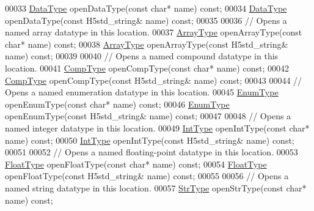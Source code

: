\begin{DoxyCode}
00033         \hyperlink{class_h5_1_1_data_type}{DataType} openDataType(\textcolor{keyword}{const} \textcolor{keywordtype}{char}* name) \textcolor{keyword}{const};
00034         \hyperlink{class_h5_1_1_data_type}{DataType} openDataType(\textcolor{keyword}{const} H5std\_string& name) \textcolor{keyword}{const};
00035 
00036         \textcolor{comment}{// Opens a named array datatype in this location.}
00037         \hyperlink{class_h5_1_1_array_type}{ArrayType} openArrayType(\textcolor{keyword}{const} \textcolor{keywordtype}{char}* name) \textcolor{keyword}{const};
00038         \hyperlink{class_h5_1_1_array_type}{ArrayType} openArrayType(\textcolor{keyword}{const} H5std\_string& name) \textcolor{keyword}{const};
00039 
00040         \textcolor{comment}{// Opens a named compound datatype in this location.}
00041         \hyperlink{class_h5_1_1_comp_type}{CompType} openCompType(\textcolor{keyword}{const} \textcolor{keywordtype}{char}* name) \textcolor{keyword}{const};
00042         \hyperlink{class_h5_1_1_comp_type}{CompType} openCompType(\textcolor{keyword}{const} H5std\_string& name) \textcolor{keyword}{const};
00043 
00044         \textcolor{comment}{// Opens a named enumeration datatype in this location.}
00045         \hyperlink{class_h5_1_1_enum_type}{EnumType} openEnumType(\textcolor{keyword}{const} \textcolor{keywordtype}{char}* name) \textcolor{keyword}{const};
00046         \hyperlink{class_h5_1_1_enum_type}{EnumType} openEnumType(\textcolor{keyword}{const} H5std\_string& name) \textcolor{keyword}{const};
00047 
00048         \textcolor{comment}{// Opens a named integer datatype in this location.}
00049         \hyperlink{class_h5_1_1_int_type}{IntType} openIntType(\textcolor{keyword}{const} \textcolor{keywordtype}{char}* name) \textcolor{keyword}{const};
00050         \hyperlink{class_h5_1_1_int_type}{IntType} openIntType(\textcolor{keyword}{const} H5std\_string& name) \textcolor{keyword}{const};
00051 
00052         \textcolor{comment}{// Opens a named floating-point datatype in this location.}
00053         \hyperlink{class_h5_1_1_float_type}{FloatType} openFloatType(\textcolor{keyword}{const} \textcolor{keywordtype}{char}* name) \textcolor{keyword}{const};
00054         \hyperlink{class_h5_1_1_float_type}{FloatType} openFloatType(\textcolor{keyword}{const} H5std\_string& name) \textcolor{keyword}{const};
00055 
00056         \textcolor{comment}{// Opens a named string datatype in this location.}
00057         \hyperlink{class_h5_1_1_str_type}{StrType} openStrType(\textcolor{keyword}{const} \textcolor{keywordtype}{char}* name) \textcolor{keyword}{const};

\end{DoxyCode}
